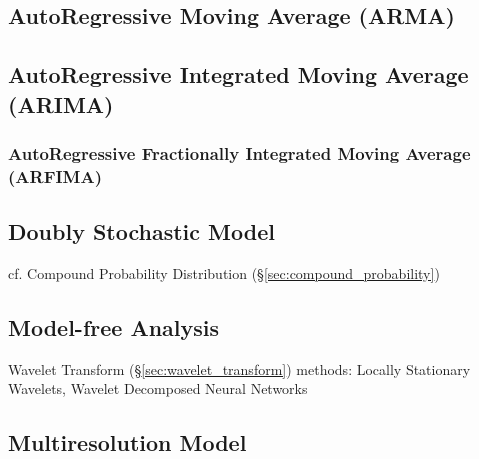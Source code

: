 \subsection{AutoRegressive Moving Average (ARMA)}\label{sec:arma}

\subsection{AutoRegressive Integrated Moving Average (ARIMA)}\label{sec:arima}

\subsubsection{AutoRegressive Fractionally Integrated Moving Average (ARFIMA)}
\label{sec:arfima}



\subsection{Doubly Stochastic Model}\label{sec:doubly_stochastic}

cf. Compound Probability Distribution (\S\ref{sec:compound_probability})



\subsection{Model-free Analysis}\label{sec:model_free_analysis}

Wavelet Transform (\S\ref{sec:wavelet_transform}) methods: Locally Stationary
Wavelets, Wavelet Decomposed Neural Networks



\subsection{Multiresolution Model}\label{sec:multiresolution_model}


